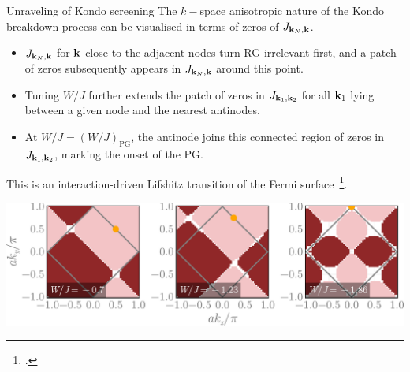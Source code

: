 \documentclass[10pt,aspectratio=169]{beamer}
\begin{document}
\begin{frame}{Unraveling of Kondo screening}
The $k-$space anisotropic nature of the Kondo breakdown process can be visualised in terms of zeros of $J_{{\bf k}_N, {\bf k}}$.
\begin{itemize}
	\item $J_{{\bf k}_N, {\bf k}}$ for ${\bf k}$ close to the adjacent nodes turn RG irrelevant first, and a patch of zeros subsequently appears in $J_{{\bf k}_N, {\bf k}}$ around this point. 
	\item Tuning $W/J$ further extends the patch of zeros in $J_{{\bf k}_1, {\bf k}_2}$ for all ${\bf k}_{1}$ lying between a given node and the nearest antinodes. 
	\item At $W/J=(W/J)_{\text{PG}}$, the antinode joins this connected region of zeros in $J_{{\bf k}_1, {\bf k}_2}$, marking the onset of the PG.
\end{itemize}

\begin{minipage}{0.19\textwidth}
This is an interaction-driven Lifshitz transition of the Fermi surface~\footcite{WuFerrero2018}.
\end{minipage}
\begin{minipage}{0.8\textwidth}
    \includegraphics[width=\linewidth]{zerosFlow.pdf}
\end{minipage}

\end{frame}
\end{document}
